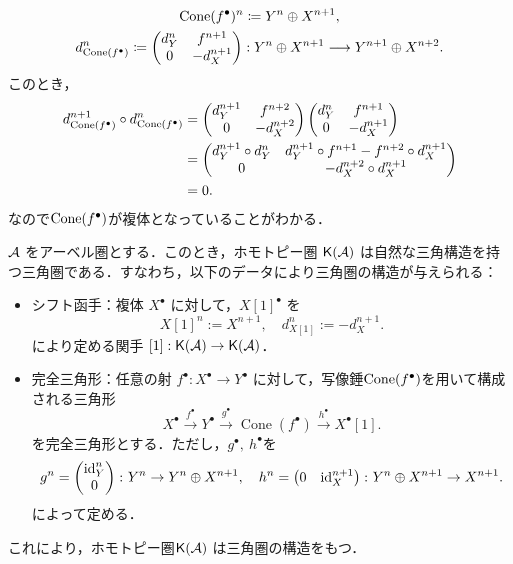 \begin{gather*}
  \operatorname{\mathrm{Cone}}(f^\bullet)^n \coloneq Y^n \oplus X^{n+1}, \\
  d^n_{\operatorname{\mathrm{Cone}}(f^\bullet)} \coloneq
  \begin{pmatrix}
    d_Y^n & f^{n+1} \\
    0     & -d_X^{n+1}
  \end{pmatrix}
  : Y^n \oplus X^{n+1} \longrightarrow Y^{n+1} \oplus X^{n+2}.
\end{gather*}
このとき，
\begin{align*}
	d^{n+1}_{\operatorname{\mathrm{Cone}}(f^\bullet)}\circ d^n_{\operatorname{\mathrm{Cone}}(f^\bullet)} &=
  \begin{pmatrix}
		d_Y^{n+1} & f^{n+2} \\
    0     & -d_X^{n+2}
  \end{pmatrix}
  \begin{pmatrix}
    d_Y^n & f^{n+1} \\
    0     & -d_X^{n+1}
  \end{pmatrix}\\
																												 &= 
  \begin{pmatrix}
		d_Y^{n+1}\circ d_Y^n & d_Y^{n+1}\circ f^{n+1} - f^{n+2}\circ d_X^{n+1} \\
    0     & -d_X^{n+2}\circ d_X^{n+1}
  \end{pmatrix}\\
					&= 0.
\end{align*}
なので$\operatorname{\mathrm{Cone}}(f^\bullet)$が複体となっていることがわかる．
\begin{prop}\cite[p.273]{KS06}
${\mathcal A}$ をアーベル圏とする．このとき，ホモトピー圏 $\mathsf{K}({\mathcal A})$ は自然な三角構造を持つ三角圏である．すなわち，以下のデータにより三角圏の構造が与えられる：
\begin{itemize}
  \item シフト函手：複体 $X^\bullet$ に対して，$X[1]^\bullet$ を
  \[
    X[1]^n := X^{n+1}, \quad d_{X[1]}^n := -d_X^{n+1}.
  \]
  により定める関手 $[1]: \mathsf{K}({\mathcal A}) \to \mathsf{K}({\mathcal A})$．
  
  \item 完全三角形：任意の射 $f^\bullet: X^\bullet \to Y^\bullet$ に対して，写像錘$\operatorname{\mathrm{Cone}}(f^\bullet)$を用いて構成される三角形
  \[
		X^\bullet \xrightarrow{f^\bullet} Y^\bullet \xrightarrow{g^\bullet} \operatorname{Cone}(f^\bullet) \xrightarrow{h^\bullet} X^\bullet[1].
  \]
  を完全三角形とする．ただし，$g^\bullet,\ h^\bullet$を
	\[g^n = \begin{pmatrix}\mathrm{id}^n_Y\\ 0\end{pmatrix}\colon Y^n\rightarrow Y^n\oplus X^{n+1},\quad h^n = \begin{pmatrix}0 & \mathrm{id}^{n+1}_X\end{pmatrix}\colon Y^n\oplus X^{n+1}\to X^{n+1}.\]
	によって定める．
\end{itemize}

これにより，ホモトピー圏$\mathsf{K}({\mathcal A})$ は三角圏の構造をもつ．
\end{prop}
